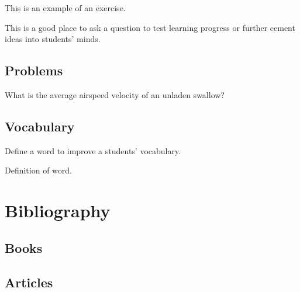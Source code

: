 \documentclass[11pt, fleqn, spanish]{book}
\begin{document}
This is an example of an exercise.

\begin{exercise}
This is a good place to ask a question to test learning progress or further cement ideas into students' minds.
\end{exercise}


\section{Problems}

\begin{problem}
What is the average airspeed velocity of an unladen swallow?
\end{problem}


\section{Vocabulary}

Define a word to improve a students' vocabulary.

\begin{vocabulary}[Word]
Definition of word.
\end{vocabulary}



\chapter*{Bibliography}
\section*{Books}
\printbibliography[heading=bibempty,type=book]
\section*{Articles}
\printbibliography[heading=bibempty,type=article]


\cleardoublepage
{}
\setlength{\columnsep}{0.75cm}
\printindex

\end{document}
